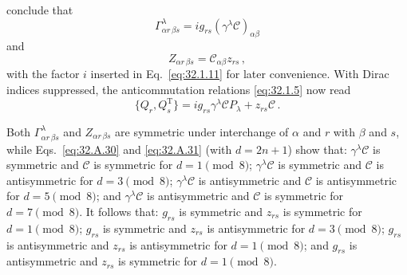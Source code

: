 conclude that
\begin{equation}
  \Gamma^\lambda_{\alpha r\,\beta s}
  =ig_{rs}(\gamma^\lambda\mathcal C)_{\alpha\beta}
  \tag{32.1.11}\label{eq:32.1.11}
\end{equation}
and
\begin{equation}
  Z_{\alpha r\,\beta s}=\mathcal C_{\alpha\beta}z_{rs}\,,
  \tag{32.1.12}\label{eq:32.1.12}
\end{equation}
with the factor \(i\) inserted in Eq.~\eqref{eq:32.1.11} for later
convenience. With Dirac indices suppressed, the anticommutation relations
\eqref{eq:32.1.5} now read
\begin{equation}
  \{Q_r,Q_s^{\mathrm T}\}
  =ig_{rs}\gamma^\lambda\mathcal C P_\lambda+z_{rs}\mathcal C\,.
  \tag{32.1.13}\label{eq:32.1.13}
\end{equation}

Both \(\Gamma^\lambda_{\alpha r\,\beta s}\) and
\(Z_{\alpha r\,\beta s}\) are symmetric under interchange of \(\alpha\)
and \(r\) with \(\beta\) and \(s\), while Eqs.~\eqref{eq:32.A.30} and
\eqref{eq:32.A.31} (with \(d=2n+1\)) show that:
\(\gamma^\lambda\mathcal C\) is symmetric and \(\mathcal C\) is symmetric
for \(d=1\pmod 8\); \(\gamma^\lambda\mathcal C\) is symmetric and
\(\mathcal C\) is antisymmetric for \(d=3\pmod 8\);
\(\gamma^\lambda\mathcal C\) is antisymmetric and \(\mathcal C\) is
antisymmetric for \(d=5\pmod 8\); and
\(\gamma^\lambda\mathcal C\) is antisymmetric and \(\mathcal C\) is
symmetric for \(d=7\pmod 8\). It follows that: \(g_{rs}\) is symmetric and
\(z_{rs}\) is symmetric for \(d=1\pmod 8\); \(g_{rs}\) is symmetric and
\(z_{rs}\) is antisymmetric for \(d=3\pmod 8\); \(g_{rs}\) is
antisymmetric and \(z_{rs}\) is antisymmetric for \(d=1\pmod 8\); and
\(g_{rs}\) is antisymmetric and \(z_{rs}\) is symmetric for
\(d=1\pmod 8\).

